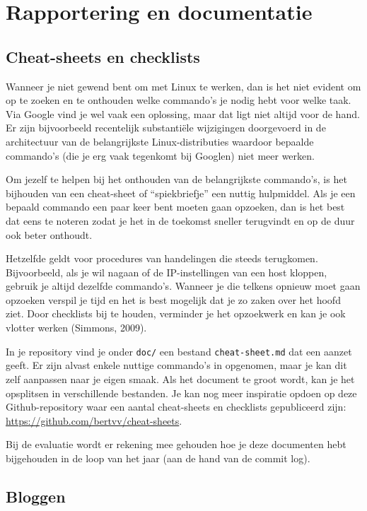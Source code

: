\section{Rapportering en
documentatie}\label{rapportering-en-documentatie}

\subsection{Cheat-sheets en
checklists}\label{cheat-sheets-en-checklists}

Wanneer je niet gewend bent om met Linux te werken, dan is het niet
evident om op te zoeken en te onthouden welke commando's je nodig hebt
voor welke taak. Via Google vind je wel vaak een oplossing, maar dat
ligt niet altijd voor de hand. Er zijn bijvoorbeeld recentelijk
substantiële wijzigingen doorgevoerd in de architectuur van de
belangrijkste Linux-distributies waardoor bepaalde commando's (die je
erg vaak tegenkomt bij Googlen) niet meer werken.

Om jezelf te helpen bij het onthouden van de belangrijkste commando's,
is het bijhouden van een cheat-sheet of ``spiekbriefje'' een nuttig
hulpmiddel. Als je een bepaald commando een paar keer bent moeten gaan
opzoeken, dan is het best dat eens te noteren zodat je het in de
toekomst sneller terugvindt en op de duur ook beter onthoudt.

Hetzelfde geldt voor procedures van handelingen die steeds terugkomen.
Bijvoorbeeld, als je wil nagaan of de IP-instellingen van een host
kloppen, gebruik je altijd dezelfde commando's. Wanneer je die telkens
opnieuw moet gaan opzoeken verspil je tijd en het is best mogelijk dat
je zo zaken over het hoofd ziet. Door checklists bij te houden,
verminder je het opzoekwerk en kan je ook vlotter werken (Simmons,
2009).

In je repository vind je onder \texttt{doc/} een bestand
\texttt{cheat-sheet.md} dat een aanzet geeft. Er zijn alvast enkele
nuttige commando's in opgenomen, maar je kan dit zelf aanpassen naar je
eigen smaak. Als het document te groot wordt, kan je het opsplitsen in
verschillende bestanden. Je kan nog meer inspiratie opdoen op deze
Github-repository waar een aantal cheat-sheets en checklists
gepubliceerd zijn: \url{https://github.com/bertvv/cheat-sheets}.

Bij de evaluatie wordt er rekening mee gehouden hoe je deze documenten
hebt bijgehouden in de loop van het jaar (aan de hand van de commit
log).

\subsection{Bloggen}\label{bloggen}

